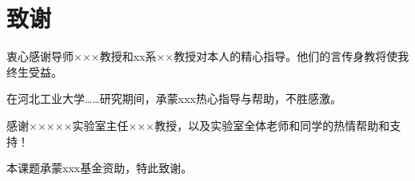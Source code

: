 \chapter*{致\qquad 谢}
衷心感谢导师×××教授和xx系××教授对本人的精心指导。他们的言传身教将使我终生受益。

在河北工业大学……研究期间，承蒙xxx热心指导与帮助，不胜感激。

感谢×××××实验室主任×××教授，以及实验室全体老师和同学的热情帮助和支持！

本课题承蒙xxx基金资助，特此致谢。